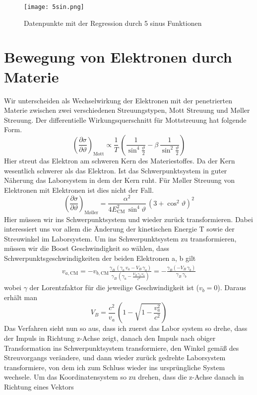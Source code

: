 \documentclass[12pt]{article}
\begin{document}
\begin{figure}[H]\centering\texttt{[image: 5sin.png]}\caption{Datenpunkte mit der Regression durch 5 sinus Funktionen}\end{figure}


\newpage
\section{Bewegung von Elektronen durch Materie}
Wir unterscheiden als Wechselwirkung der Elektronen mit der penetrierten Materie zwischen zwei verschiedenen Streuungstypen, Mott Streuung und Møller Streuung.
Der differentielle Wirkungsquerschnitt für Mottstreuung hat folgende Form.
$$\left(\frac{\partial\sigma}{\partial\vartheta}\right)_\text{Mott}\propto\frac{1}{T}\,\left(\frac{1}{\sin^4\frac{\vartheta}{2}}-\beta\,\frac{1}{\sin^2\frac{\vartheta}{2}}\right)$$
Hier streut das Elektron am schweren Kern des Materiestoffes. Da der Kern wesentlich schwerer als das Elektron. Ist das Schwerpunktsystem in guter Näherung das Laborsystem in dem der Kern ruht.
Für Møller Streuung von Elektronen mit Elektronen ist dies nicht der Fall.
$$\left(\frac{\partial\sigma}{\partial\vartheta}\right)_\text{Møller}=\frac{\alpha^2}{4E_\text{CM}^2\,\sin^4\vartheta}\,\left(3+\cos^2\vartheta\right)^2$$
Hier müssen wir ins Schwerpunktsystem und wieder zurück transformieren. Dabei interessiert uns vor allem die Änderung der kinetischen Energie T sowie der Streuwinkel im Laborsystem. Um ins Schwerpunktsystem zu transformieren, müssen wir die Boost Geschwindigkeit so wählen, dass Schwerpunktsgeschwindigkeiten der beiden Elektronen a, b gilt
\begin{align*}
    v_{a,\text{CM}}=-v_{b,\text{CM}}
    \frac{\gamma_B\,\left(\gamma_a\,v_a-V_B\,\gamma_a\right)}{\gamma_B\,\left(\gamma_a-\frac{V_B\,\gamma_a\,v_a}{c^2}\right)}=-\frac{\gamma_B\left(-V_B\,\gamma_b\right)}{\gamma_B\,\gamma_b}
\end{align*}
wobei $\gamma$ der Lorentzfaktor für die jeweilige Geschwindigkeit ist ($v_b=0$).
Daraus erhält man
$$V_B=\frac{c^2}{v_a}\,\left(1-\sqrt{1-\frac{v_a^2}{c^2}}\right)$$
Das Verfahren sieht nun so aus, dass ich zuerst das Labor system so drehe, dass der Impuls in Richtung z-Achse zeigt, danach den Impuls nach obiger Transformation ins Schwerpunktsystem transformiere, den Winkel gemäß des Streuvorgangs verändere, und dann wieder zurück gedrehte Laborsystem transformiere, von dem ich zum Schluss wieder ins ursprüngliche System wechsele.
Um das Koordinatensystem so zu drehen, dass die z-Achse danach in Richtung eines Vektors
\end{document}
